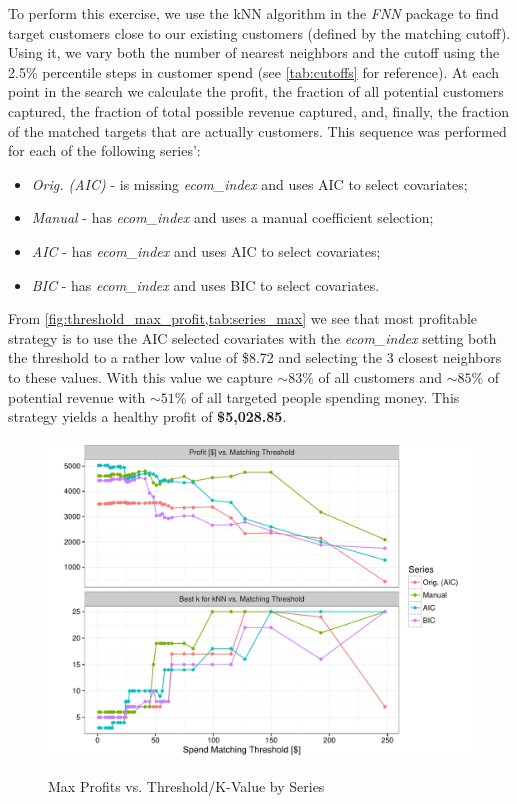 To perform this exercise, we use the kNN algorithm in the \textit{FNN} package to find target customers close to our existing customers (defined by the matching cutoff).  Using it, we vary both the number of nearest neighbors and the cutoff using the 2.5\% percentile steps in customer spend (see \vref{tab:cutoffs} for reference).  At each point in the search we calculate the profit, the fraction of all potential customers captured, the fraction of total possible revenue captured, and, finally, the fraction of the matched targets that are actually customers.  This sequence was performed for each of the following series':
\begin{itemize}
\item \textit{Orig. (AIC)} - is missing \textit{ecom\_index} and uses AIC to select covariates;
\item \textit{Manual} - has \textit{ecom\_index} and uses a manual coefficient selection;
\item \textit{AIC} - has \textit{ecom\_index} and uses AIC to select covariates;
\item \textit{BIC} - has \textit{ecom\_index} and uses BIC to select covariates.
\end{itemize}

From \vref{fig:threshold_max_profit,tab:series_max} we see that most profitable strategy is to use the AIC selected covariates with the \textit{ecom\_index} setting both the threshold to a rather low value of \$8.72 and selecting the 3 closest neighbors to these values.  With this value we capture $\sim83\%$ of all customers and $\sim85\%$ of potential revenue with $\sim51\%$ of all targeted people spending money.  This strategy yields a healthy profit of \textbf{\$5,028.85}.

\begin{figure}[!htb]
  \centering
  \caption{Max Profits vs. Threshold/K-Value by Series}
  \includegraphics[scale=.75]{threshold_max_profit2.pdf}
  \label{fig:threshold_max_profit}
\end{figure}


